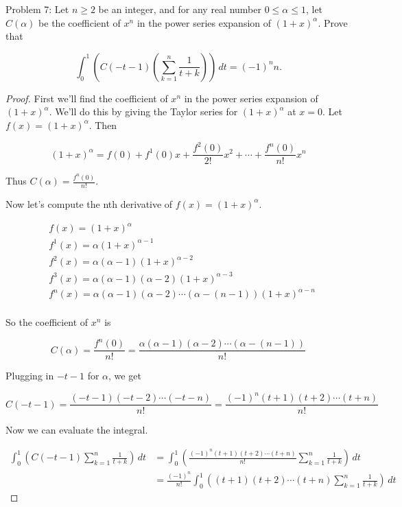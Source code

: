 \usepackage{amsthm}

Problem 7: Let $n \ge 2$ be an integer, and for any real number $0 \le \alpha \le 1$, let $C(\alpha)$ be the coefficient of $x^n$ in the power series expansion of $(1+x)^\alpha$. Prove that

\[\int_0^1 \left(C(-t-1)\left(\sum_{k=1}^n \frac{1}{t+k}\right)\right)\,dt = (-1)^n n. \]

\begin{proof}
First we'll find the coefficient of $x^n$ in the power series expansion of $(1 + x)^\alpha$. We'll do this by giving the Taylor series for $(1 + x)^\alpha$ at $x = 0$. Let $f(x) = (1 + x)^\alpha$. Then

\[ 
(1 + x)^\alpha = f(0) + f^1(0)x + \frac{f^2(0)}{2!}x^2 + \cdots + \frac{f^n(0)}{n!}x^n 
\]

Thus $\displaystyle C(\alpha) = \frac{f^n(0)}{n!}$.

Now let's compute the nth derivative of $f(x) = (1 + x)^\alpha$.

\begin{align*}
& f(x) = (1 + x)^\alpha \\
& f^1(x) = \alpha(1 + x)^{\alpha - 1} \\
& f^2(x) = \alpha(\alpha - 1)(1 + x)^{\alpha - 2} \\
& f^3(x) = \alpha(\alpha - 1)(\alpha - 2)(1 + x)^{\alpha - 3} \\
& f^n(x) = \alpha(\alpha - 1)(\alpha - 2)\cdots(\alpha - (n-1))(1 + x)^{\alpha - n} \\
\end{align*}

So the coefficient of $x^n$ is

\[ C(\alpha) = \frac{f^n(0)}{n!} = \frac{\alpha(\alpha - 1)(\alpha - 2)\cdots(\alpha - (n-1))}{n!} \]

Plugging in $-t - 1$ for $\alpha$, we get

\[ C(-t - 1) = \frac{(-t - 1)(-t - 2)\cdots(-t - n)}{n!} = \frac{(-1)^n (t + 1)(t + 2)\cdots(t + n)}{n!} \]

Now we can evaluate the integral.

\begin{align*}
\int_0^1 \left(C(-t - 1) \sum_{k=1}^{n} \frac{1}{t + k} \right) \, dt 
&= \int_0^1 \left( \frac{(-1)^n (t + 1)(t + 2)\cdots(t + n)}{n!} \sum_{k=1}^{n} \frac{1}{t + k} \right) \, dt \\
&= \frac{(-1)^n}{n!} \int_0^1 \left( (t + 1)(t + 2)\cdots(t + n) \sum_{k=1}^{n} \frac{1}{t + k} \right) \, dt
\end{align*}


\end{proof}
